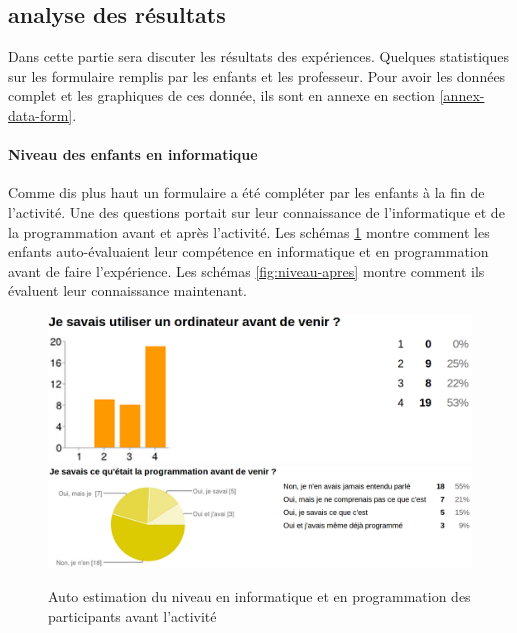 \subsection{analyse des résultats}
Dans cette partie sera discuter les résultats des expériences. Quelques statistiques sur les formulaire remplis par les enfants et les professeur. Pour avoir les données complet et les graphiques de ces donnée, ils sont en annexe en section \ref{annex-data-form}.

\paragraph{Niveau des enfants en informatique}
Comme dis plus haut un formulaire a été compléter par les enfants à la fin de l'activité. Une des questions portait sur leur connaissance de l'informatique et de la programmation avant et après l'activité. Les schémas \ref{fig:niveau-avant} montre comment les enfants auto-évaluaient leur compétence en informatique et en programmation avant de faire l'expérience. Les schémas \ref{fig:niveau-apres} montre comment ils évaluent leur connaissance maintenant.
\begin{figure}[ht]
  \begin{center}
    \includegraphics[scale=0.3]{content/8-validation/images/avant}
    \includegraphics[scale=0.2]{content/8-validation/images/programmation}
    \caption{Auto estimation du niveau en informatique et en programmation des participants avant l'activité}
    \label{fig:niveau-avant}
  \end{center}
\end{figure}
